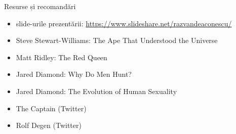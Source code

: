 \documentclass{simple}
\begin{document}
%

\begin{frame}{Resurse și recomandări}
  \begin{itemize}
    \item slide-urile prezentării: \url{https://www.slideshare.net/razvandeaconescu/}
    \item Steve Stewart-Williams: The Ape That Understood the Universe
    \item Matt Ridley: The Red Queen
    \item Jared Diamond: Why Do Men Hunt?
    \item Jared Diamond: The Evolution of Human Sexuality
    \item The Captain (Twitter)
    \item Rolf Degen (Twitter)
  \end{itemize}
\end{frame}
\end{document}
